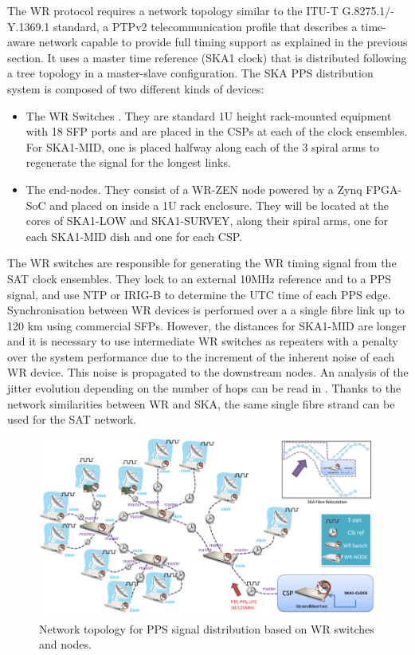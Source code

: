 The WR protocol requires a network topology similar to the ITU-T
G.8275.1/-\allowbreak Y.1369.1 standard, a PTPv2 telecommunication profile that
describes a time-aware network capable to provide full timing support
\cite{itu:TG8275_1_Y_1369_1} as explained in the previous section. It uses a master
time reference (SKA1 clock) that is distributed following a tree topology in a
master-slave configuration. The SKA PPS distribution system is composed of two
different kinds of devices:

\begin{itemize} \item {The WR Switches \cite{sevensols:wr_switch}. They are
			standard 1U height rack-mounted equipment with 18 SFP
			ports and are placed in the CSPs at each of the clock
			ensembles. For SKA1-MID, one is placed halfway along
			each of the 3 spiral arms to regenerate the signal for
		the longest links.} \item{The end-nodes. They consist of a
			WR-ZEN node \cite{sevensols:wr_zen} powered by a Zynq
			FPGA-SoC and placed on inside a 1U rack enclosure. They
			will be located at the cores of SKA1-LOW and
SKA1-SURVEY, along their spiral arms, one for each SKA1-MID dish and one for
each CSP.} \end{itemize}

The WR switches are responsible for generating the WR timing signal from the
SAT clock ensembles. They lock to an external 10MHz reference and to a PPS
signal, and use NTP or IRIG-B to determine the UTC time of each PPS edge.
Synchronisation between WR devices is performed over a a single fibre link up
to 120 km using commercial SFPs.  However, the distances for SKA1-MID are
longer and it is necessary to use intermediate WR switches as repeaters with a
penalty over the system performance due to the increment of the inherent noise of
each WR device. This noise is propagated to the downstream nodes. An analysis of
the jitter evolution depending on the number of hops can be read in
\cite{torres2016scalability}. Thanks to the network similarities between WR and
SKA, the same single fibre strand can be used for the SAT network. 

\begin{figure}[H] \centering \includegraphics[scale=0.4]{img/ska_pps_network}
\caption{Network topology for PPS signal distribution based on WR switches and
nodes. }
\label{fig:ska_pps_dist_network} \end{figure}

